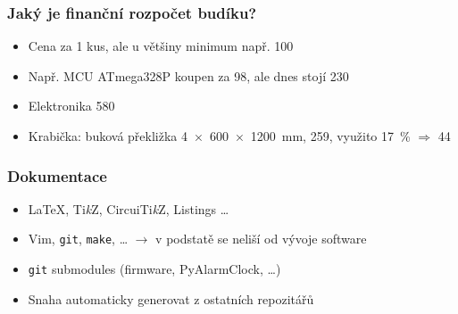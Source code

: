 \documentclass[
    utf8,
    aspectratio=169,
    17pt,  %
]{beamer}
\def\TikZ{Ti\emph{k}Z}
\def\Circuitikz{Circui\TikZ}
\begin{document}
\begin{frame}
    \frametitle{Jaký je finanční rozpočet budíku?}
    \begin{itemize}
        \item Cena za 1 kus, ale u většiny minimum např. \SI{100}{\ks}
        \item Např. MCU ATmega328P koupen za \SI{98}{\Kc}, ale dnes stojí
            \SI{230}{\Kc}
        \vspace{5mm}
        \item Elektronika \alert{\SI{580}{\Kc}}
        \item Krabička: buková překližka
            \SI[product-units=single]{4x600x1200}{\milli\meter},
            \SI{259}{\Kc}, využito \SI{17}{\percent} $\Rightarrow$ \alert{\SI{44}{\Kc}}
    \end{itemize}
\end{frame}



\begin{frame}
    \frametitle{Dokumentace}
    \begin{itemize}
        \item {\rmfamily\LaTeX{}}, {\rmfamily\TikZ{}},
            {\rmfamily\Circuitikz{}}, Listings \ldots
        \item Vim, \texttt{git}, \texttt{make}, \ldots
            $\rightarrow$ v podstatě se neliší od vývoje software
        \item \texttt{git} submodules (firmware, PyAlarmClock, \ldots)
        \item Snaha automaticky generovat z ostatních repozitářů
    \end{itemize}
\end{frame}
\end{document}
